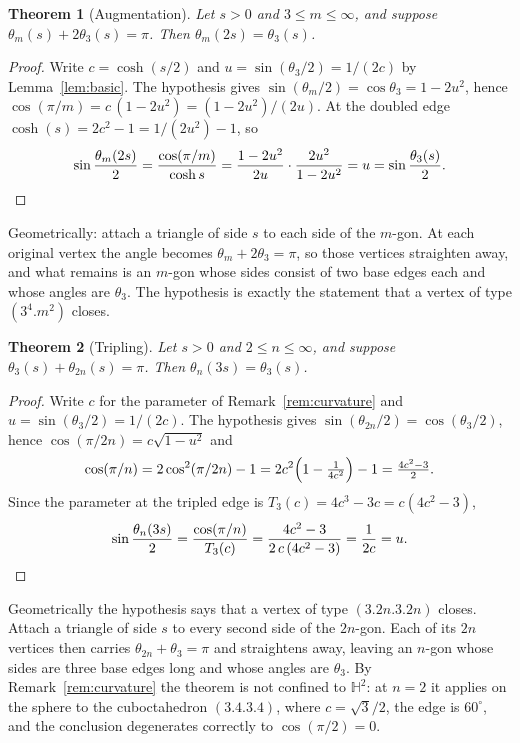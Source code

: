 \documentclass[11pt,a4paper]{article}
\theoremstyle{plain}
\newtheorem{theorem}{Theorem}[section]
\theoremstyle{definition}
\theoremstyle{remark}
\newcommand{\HH}{\mathbb{H}^2}
\newcommand{\vc}[1]{(#1)}
\begin{document}
\begin{theorem}[Augmentation]\label{thm:star}
Let $s>0$ and $3\le m\le\infty$, and suppose
$\theta_m(s)+2\theta_3(s)=\pi$. Then $\theta_m(2s)=\theta_3(s)$.
\end{theorem}

\begin{proof}
Write $c=\cosh(s/2)$ and $u=\sin(\theta_3/2)=1/(2c)$ by Lemma~\ref{lem:basic}.
The hypothesis gives $\sin(\theta_m/2)=\cos\theta_3=1-2u^{2}$, hence
$\cos(\pi/m)=c\,(1-2u^{2})=(1-2u^{2})/(2u)$. At the doubled edge
$\cosh(s)=2c^{2}-1=1/(2u^{2})-1$, so
\[
  \sin\frac{\theta_m(2s)}{2}
  =\frac{\cos(\pi/m)}{\cosh s}
  =\frac{1-2u^{2}}{2u}\cdot\frac{2u^{2}}{1-2u^{2}}
  =u=\sin\frac{\theta_3(s)}{2}. \qedhere
\]
\end{proof}

Geometrically: attach a triangle of side $s$ to each side of the $m$-gon. At each
original vertex the angle becomes $\theta_m+2\theta_3=\pi$, so those vertices
straighten away, and what remains is an $m$-gon whose sides consist of two base
edges each and whose angles are $\theta_3$. The hypothesis is exactly the
statement that a vertex of type $\vc{3^{4}.m^{2}}$ closes.

\begin{theorem}[Tripling]\label{thm:triple}
Let $s>0$ and $2\le n\le\infty$, and suppose $\theta_3(s)+\theta_{2n}(s)=\pi$.
Then $\theta_n(3s)=\theta_3(s)$.
\end{theorem}

\begin{proof}
Write $c$ for the parameter of Remark~\ref{rem:curvature} and
$u=\sin(\theta_3/2)=1/(2c)$. The hypothesis gives
$\sin(\theta_{2n}/2)=\cos(\theta_3/2)$, hence
$\cos(\pi/2n)=c\sqrt{1-u^{2}}$ and
\[
  \cos(\pi/n)=2\cos^{2}(\pi/2n)-1=2c^{2}\Bigl(1-\tfrac{1}{4c^{2}}\Bigr)-1
  =\tfrac{4c^{2}-3}{2}.
\]
Since the parameter at the tripled edge is $T_3(c)=4c^{3}-3c=c(4c^{2}-3)$,
\[
  \sin\frac{\theta_n(3s)}{2}=\frac{\cos(\pi/n)}{T_3(c)}
  =\frac{4c^{2}-3}{2\,c\,(4c^{2}-3)}=\frac{1}{2c}=u . \qedhere
\]
\end{proof}

Geometrically the hypothesis says that a vertex of type $\vc{3.2n.3.2n}$ closes.
Attach a triangle of side $s$ to every second side of the $2n$-gon. Each of its
$2n$ vertices then carries $\theta_{2n}+\theta_3=\pi$ and straightens away,
leaving an $n$-gon whose sides are three base edges long and whose angles are
$\theta_3$. By Remark~\ref{rem:curvature} the theorem is not confined to $\HH$:
at $n=2$ it applies on the sphere to the cuboctahedron $\vc{3.4.3.4}$, where
$c=\sqrt3/2$, the edge is $60^{\circ}$, and the conclusion degenerates correctly
to $\cos(\pi/2)=0$.
\end{document}
